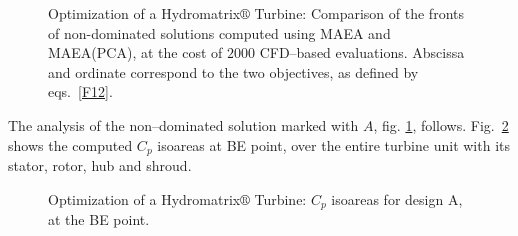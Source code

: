 \begin{figure}[h!]
\begin{minipage}[b]{1\linewidth}
 \centering
\end{minipage}
\caption{Optimization of a Hydromatrix$\circledR$ Turbine: Comparison of the fronts of non-dominated solutions computed using MAEA and MAEA(PCA), at the cost of $2000$ CFD--based evaluations.  Abscissa and ordinate correspond to the two objectives, as defined by eqs.~\ref{F12}.}
\label{pareto_matrix}
\end{figure}
 
 
The analysis of the non--dominated solution marked with $A$, fig. \ref{pareto_matrix}, follows. Fig.~\ref{All_press} shows the computed $C_p$ isoareas at BE point, over the entire turbine unit with its stator, rotor, hub and shroud. 

\begin{figure}[h!]
\begin{minipage}[b]{1\linewidth}
 \centering
\end{minipage}
\caption{Optimization of a Hydromatrix$\circledR$ Turbine: $C_p$ isoareas for design A, at the BE point.}
\label{All_press}
\end{figure}


